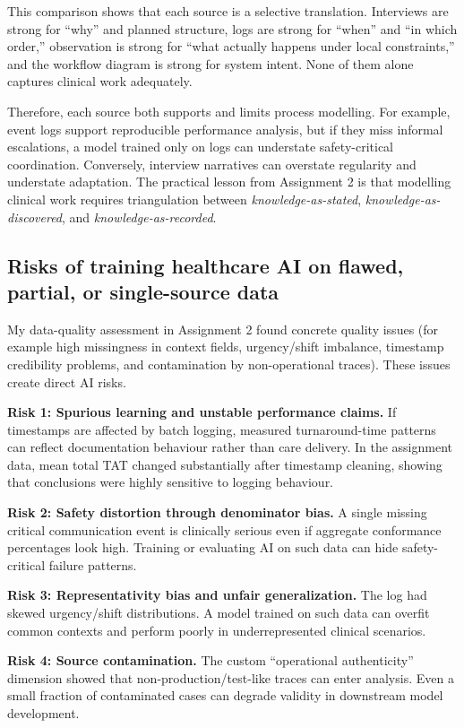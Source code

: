This comparison shows that each source is a selective translation. Interviews are strong for ``why'' and planned structure, logs are strong for ``when'' and ``in which order,'' observation is strong for ``what actually happens under local constraints,'' and the workflow diagram is strong for system intent. None of them alone captures clinical work adequately.

Therefore, each source both supports and limits process modelling. For example, event logs support reproducible performance analysis, but if they miss informal escalations, a model trained only on logs can understate safety-critical coordination. Conversely, interview narratives can overstate regularity and understate adaptation. The practical lesson from Assignment 2 is that modelling clinical work requires triangulation between \textit{knowledge-as-stated}, \textit{knowledge-as-discovered}, and \textit{knowledge-as-recorded}.

\subsection{Risks of training healthcare AI on flawed, partial, or single-source data}
\label{subsec:a2_risks_flawed_data}

My data-quality assessment in Assignment 2 found concrete quality issues (for example high missingness in context fields, urgency/shift imbalance, timestamp credibility problems, and contamination by non-operational traces). These issues create direct AI risks.

\textbf{Risk 1: Spurious learning and unstable performance claims.}
If timestamps are affected by batch logging, measured turnaround-time patterns can reflect documentation behaviour rather than care delivery. In the assignment data, mean total TAT changed substantially after timestamp cleaning, showing that conclusions were highly sensitive to logging behaviour.

\textbf{Risk 2: Safety distortion through denominator bias.}
A single missing critical communication event is clinically serious even if aggregate conformance percentages look high. Training or evaluating AI on such data can hide safety-critical failure patterns.

\textbf{Risk 3: Representativity bias and unfair generalization.}
The log had skewed urgency/shift distributions. A model trained on such data can overfit common contexts and perform poorly in underrepresented clinical scenarios.

\textbf{Risk 4: Source contamination.}
The custom ``operational authenticity'' dimension showed that non-production/test-like traces can enter analysis. Even a small fraction of contaminated cases can degrade validity in downstream model development.

